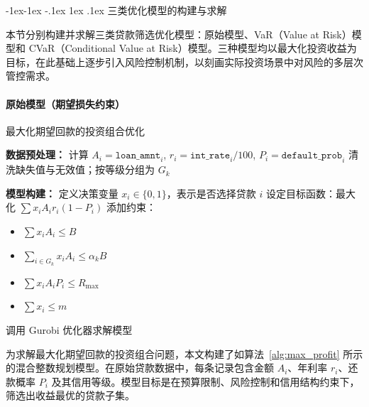\documentclass{write_paper}
\makeatletter
\renewcommand\subsection{\@startsection{subsection}{2}{\z@}%
                                     {-1ex\@plus -1ex \@minus -.1ex}%
                                     {1ex \@plus .1ex}%
                                     {\normalfont \normalsize \bfseries}}
\makeatother
\begin{document}
\subsection{三类优化模型的构建与求解}
\label{subsec:model_solving}

本节分别构建并求解三类贷款筛选优化模型：原始模型、VaR（Value at Risk）模型和 CVaR（Conditional Value at Risk）模型。三种模型均以最大化投资收益为目标，在此基础上逐步引入风险控制机制，以刻画实际投资场景中对风险的多层次管控需求。

\vspace{1em}
\paragraph{原始模型（期望损失约束）}

\begin{algorithm}[htbp]
\caption{最大化期望回款的投资组合优化}
\label{alg:max_profit}

\BlankLine
\textbf{数据预处理：} 计算 $A_i = \texttt{loan\_amnt}_i$, $r_i = \texttt{int\_rate}_i / 100$, $P_i = \texttt{default\_prob}_i$\;
清洗缺失值与无效值；按等级分组为 $G_k$\;

\BlankLine
\textbf{模型构建：}\;
定义决策变量 $x_i \in \{0,1\}$，表示是否选择贷款 $i$\;
设定目标函数：最大化 $\sum x_i A_i r_i(1 - P_i) $\;
添加约束：
\begin{itemize}
  \item $\sum x_i A_i \le B$ \hfill {}
  \item $\sum_{i \in G_k} x_i A_i \le \alpha_k B$ \hfill {}
  \item $\sum x_i A_i P_i \le R_{\max}$ \hfill {}
  \item $\sum x_i \le m$ \hfill {}
\end{itemize}

\BlankLine
调用 Gurobi 优化器求解模型\;
\end{algorithm}

为求解最大化期望回款的投资组合问题，本文构建了如算法~\ref{alg:max_profit} 所示的混合整数规划模型。在原始贷款数据中，每条记录包含金额 $A_i$、年利率 $r_i$、还款概率 $P_i$ 及其信用等级。模型目标是在预算限制、风险控制和信用结构约束下，筛选出收益最优的贷款子集。
\end{document}

